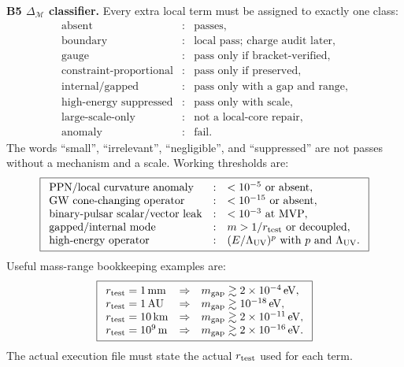 \documentclass[11pt]{article}
\begin{document}
\medskip\noindent\textbf{B5 \(\Delta_{\mathcal M}\) classifier.}
Every extra local term must be assigned to exactly one class:
\[
\boxed{
\begin{array}{lll}
\text{absent} &:& \text{passes},\\
\text{boundary} &:& \text{local pass; charge audit later},\\
\text{gauge} &:& \text{pass only if bracket-verified},\\
\text{constraint-proportional} &:& \text{pass only if preserved},\\
\text{internal/gapped} &:& \text{pass only with a gap and range},\\
\text{high-energy suppressed} &:& \text{pass only with scale},\\
\text{large-scale-only} &:& \text{not a local-core repair},\\
\text{anomaly} &:& \text{fail}.
\end{array}}
\]
The words ``small'', ``irrelevant'', ``negligible'', and ``suppressed'' are not
passes without a mechanism and a scale.  Working thresholds are:
\[
\boxed{
\begin{array}{lll}
\text{PPN/local curvature anomaly} &:& <10^{-5}\ \text{or absent},\\
\text{GW cone-changing operator} &:& <10^{-15}\ \text{or absent},\\
\text{binary-pulsar scalar/vector leak} &:& <10^{-3}\ \text{at MVP},\\
\text{gapped/internal mode} &:& m>1/r_{\rm test}\ \text{or decoupled},\\
\text{high-energy operator} &:& (E/\Lambda_{\rm UV})^p\ \text{with }p
\text{ and }\Lambda_{\rm UV}.
\end{array}}
\]
Useful mass-range bookkeeping examples are:
\[
\boxed{
\begin{array}{lll}
r_{\rm test}=1{\rm\,mm} &\Rightarrow& m_{\rm gap}\gtrsim2\times10^{-4}{\rm\,eV},\\
r_{\rm test}=1{\rm\,AU} &\Rightarrow& m_{\rm gap}\gtrsim10^{-18}{\rm\,eV},\\
r_{\rm test}=10{\rm\,km} &\Rightarrow& m_{\rm gap}\gtrsim2\times10^{-11}{\rm\,eV},\\
r_{\rm test}=10^9{\rm\,m} &\Rightarrow& m_{\rm gap}\gtrsim2\times10^{-16}{\rm\,eV}.
\end{array}}
\]
The actual execution file must state the actual \(r_{\rm test}\) used for each
term.
\end{document}
